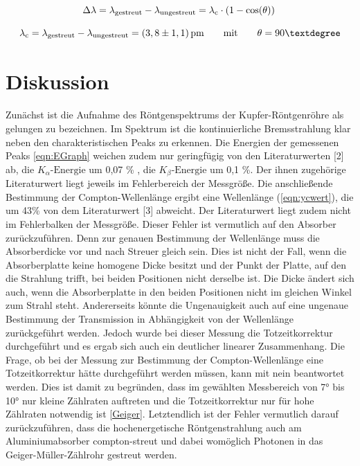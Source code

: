 \documentclass[titlepage = firstcover]{scrartcl}
\begin{document}
        \begin{equation*}
            \Delta \lambda = \lambda_{\text{gestreut}} - \lambda_{\text{ungestreut}} = \lambda_{\text{c}} \cdot \left(1 -\cos (\theta)\right) \\
            \label{eqn:ycexp}
        \end{equation*}

        \begin{equation}
            \lambda_{\text{c}} = \lambda_{\text{gestreut}} - \lambda_{\text{ungestreut}} = (3,8 \pm 1,1) \, \text{pm} \qquad \text{mit} \qquad \theta=90° \\
            \label{eqn:ycwert}
        \end{equation} 



    \section{Diskussion}
        Zunächst ist die Aufnahme des Röntgenspektrums der Kupfer-Röntgenröhre als gelungen zu bezeichnen. Im Spektrum ist die kontinuierliche Bremsstrahlung 
        klar neben den charakteristischen Peaks zu erkennen. Die Energien der gemessenen Peaks \ref{eqn:EGraph} weichen zudem nur geringfügig von den Literaturwerten [2] ab, 
        die $K_{\alpha}\text{-Energie}$ um 0,07 \% , die $K_{\beta}\text{-Energie}$ um 0,1 \%. Der ihnen zugehörige Literaturwert liegt jeweils im Fehlerbereich der Messgröße.
        Die anschließende Bestimmung der Compton-Wellenlänge ergibt eine Wellenlänge (\ref{eqn:ycwert}), die um 43\% von dem Literaturwert [3] abweicht. Der Literaturwert liegt zudem nicht
        im Fehlerbalken der Messgröße. Dieser Fehler ist vermutlich auf den Absorber zurückzuführen. Denn zur genauen Bestimmung der Wellenlänge muss die Absorberdicke vor und nach Streuer gleich sein.
        Dies ist nicht der Fall, wenn die Absorberplatte keine homogene Dicke besitzt und der Punkt der Platte, auf den die Strahlung trifft, bei beiden Positionen nicht derselbe ist. Die Dicke ändert
        sich auch, wenn die Absorberplatte in den beiden Positionen nicht im gleichen Winkel zum Strahl steht. Andererseits könnte die Ungenauigkeit auch auf eine ungenaue Bestimmung der Transmission 
        in Abhängigkeit von der Wellenlänge zurückgeführt werden. Jedoch wurde bei dieser Messung die Totzeitkorrektur durchgeführt und es ergab sich auch ein deutlicher linearer Zusammenhang. 
        Die Frage, ob bei der Messung zur Bestimmung der Compton-Wellenlänge eine Totzeitkorrektur hätte durchgeführt werden müssen, kann mit nein beantwortet werden. Dies ist damit zu begründen,
        dass im gewählten Messbereich von 7° bis 10° nur kleine Zählraten auftreten und die Totzeitkorrektur nur für hohe Zählraten notwendig ist \ref{Geiger}. Letztendlich ist der Fehler 
        vermutlich darauf zurückzuführen, dass die hochenergetische Röntgenstrahlung auch am Aluminiumabsorber compton-streut und dabei womöglich Photonen
        in das Geiger-Müller-Zählrohr gestreut werden.
\end{document}
